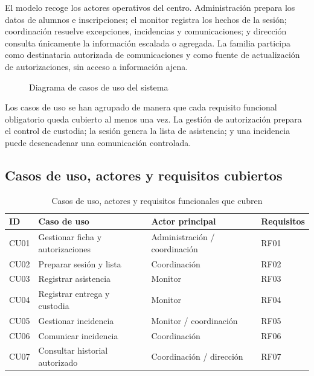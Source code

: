 El modelo recoge los actores operativos del centro. Administración prepara los datos de alumnos e inscripciones; el monitor registra los hechos de la sesión; coordinación resuelve excepciones, incidencias y comunicaciones; y dirección consulta únicamente la información escalada o agregada. La familia participa como destinataria autorizada de comunicaciones y como fuente de actualización de autorizaciones, sin acceso a información ajena.

\begin{figure}[htbp]
\centering
{}
\caption{Diagrama de casos de uso del sistema}\label{fig:3}
\end{figure}

Los casos de uso se han agrupado de manera que cada requisito funcional obligatorio queda cubierto al menos una vez. La gestión de autorización prepara el control de custodia; la sesión genera la lista de asistencia; y una incidencia puede desencadenar una comunicación controlada.

\subsection{Casos de uso, actores y requisitos cubiertos}\label{sec:4-1-1}

\begin{table}[H]
\centering\small
\begin{tabularx}{\textwidth}{>{\hsize=0.420\hsize\raggedright\arraybackslash}X>{\hsize=1.635\hsize\raggedright\arraybackslash}X>{\hsize=1.246\hsize\raggedright\arraybackslash}X>{\hsize=0.700\hsize\raggedright\arraybackslash}X}
\toprule
\rowcolor{cabeceratabla} \textbf{ID} & \textbf{Caso de uso} & \textbf{Actor principal} & \textbf{Requisitos} \\
\midrule
CU01 & Gestionar ficha y autorizaciones & Administración / coordinación & RF01 \\
CU02 & Preparar sesión y lista & Coordinación & RF02 \\
CU03 & Registrar asistencia & Monitor & RF03 \\
CU04 & Registrar entrega y custodia & Monitor & RF04 \\
CU05 & Gestionar incidencia & Monitor / coordinación & RF05 \\
CU06 & Comunicar incidencia & Coordinación & RF06 \\
CU07 & Consultar historial autorizado & Coordinación / dirección & RF07 \\
\bottomrule
\end{tabularx}
\caption{Casos de uso, actores y requisitos funcionales que cubren}\label{tab:24}
\end{table}

